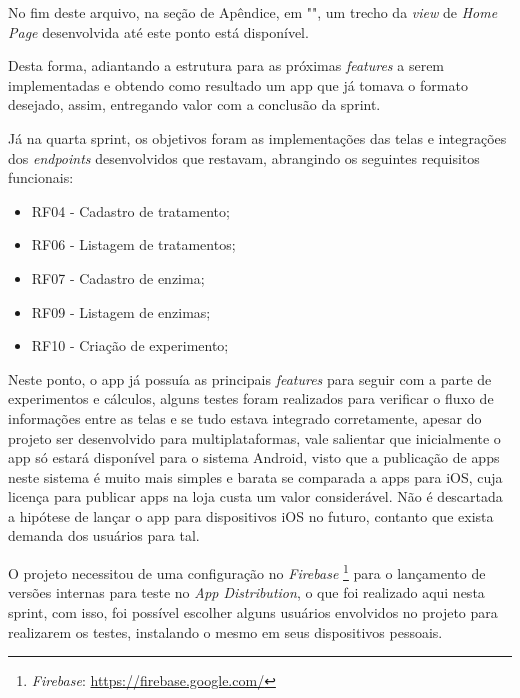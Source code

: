 No fim deste arquivo, na seção de Apêndice, em "", um trecho da \textit{view} de \textit{Home Page} desenvolvida até este ponto está disponível.

Desta forma, adiantando a estrutura para as próximas \textit{features} a serem implementadas e obtendo como resultado um \ac{app} que já tomava o formato desejado, assim, entregando valor com a conclusão da sprint.

Já na quarta sprint, os objetivos foram as implementações das telas e integrações dos \textit{endpoints} desenvolvidos que restavam, abrangindo os seguintes requisitos funcionais:
\begin{itemize}
   \item RF04 - Cadastro de tratamento;
   \item RF06 - Listagem de tratamentos;
   \item RF07 - Cadastro de enzima;
   \item RF09 - Listagem de enzimas;
   \item RF10 - Criação de experimento;
 \end{itemize}

 Neste ponto, o \ac{app} já possuía as principais \textit{features} para seguir com a parte de experimentos e cálculos, alguns testes foram realizados para verificar o fluxo de informações entre as telas e se tudo estava integrado corretamente, apesar do projeto ser desenvolvido para multiplataformas, vale salientar que inicialmente o \ac{app} só estará disponível para o sistema Android, visto que a publicação de \acp{app} neste sistema é muito mais simples e barata se comparada a \acp{app} para iOS, cuja licença para publicar \acp{app} na loja custa um valor considerável. Não é descartada a hipótese de lançar o \ac{app} para dispositivos iOS no futuro, contanto que exista demanda dos usuários para tal.

 O projeto necessitou de uma configuração no \textit{Firebase} \footnote{\label{firebase}\textit{Firebase}: \url{https://firebase.google.com/}} para o lançamento de versões internas para teste no \textit{App Distribution}, o que foi realizado aqui nesta sprint, com isso, foi possível escolher alguns usuários envolvidos no projeto para realizarem os testes, instalando o mesmo em seus dispositivos pessoais. 

